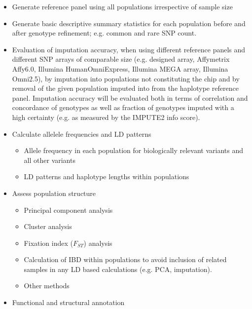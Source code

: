 \begin{itemize}
 \item Generate reference panel using all populations irrespective of sample size
 \item Generate basic descriptive summary statistics for each population before and after genotype refinement; e.g. common and rare SNP count.
 \item Evaluation of imputation accuracy, when using different reference panels and different SNP arrays of comparable size (e.g. designed array, Affymetrix Affy6.0, Illumina HumanOmniExpress, Illumina MEGA array, Illumina Omni2.5), by imputation into populations not constituting the chip and by removal of the given population imputed into from the haplotype reference panel. Imputation accuracy will be evaluated both in terms of correlation and concordance of genotypes as well as fraction of genotypes imputed with a high certainty (e.g. as measured by the IMPUTE2 info score).
 \item Calculate allelele frequencies and LD patterns
 \begin{itemize}
  \item Allele frequency in each population for biologically relevant variants and all other variants
  \item LD patterns and haplotype lengths within populations
 \end{itemize}
 \item Assess population structure
 \begin{itemize}
  \item Principal component analysis
  \item Cluster analysis
  \item {Fixation index ($F_{ST}$) analysis
  }
  \item Calculation of IBD within populations to avoid inclusion of related samples in any LD based calculations (e.g. PCA, imputation).
  \item Other methods
 \end{itemize}
 \item Functional and structural annotation
  \begin{itemize}

\end{itemize}
\end{itemize}
